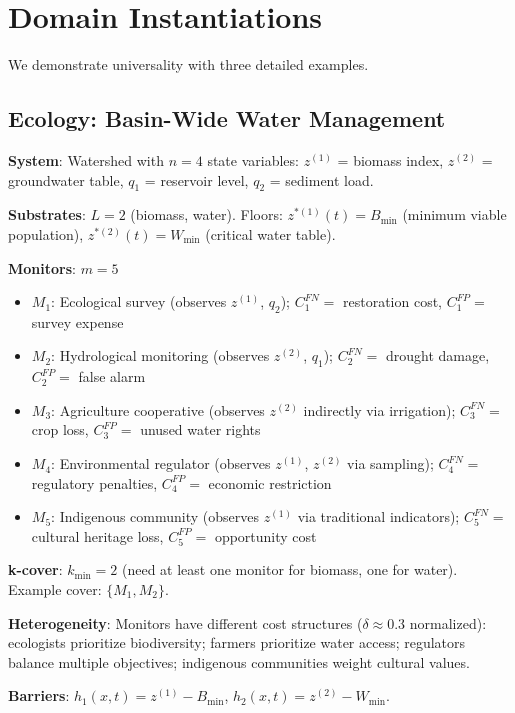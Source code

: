 \documentclass[11pt,a4paper]{article}
\begin{document}
\section{Domain Instantiations}

We demonstrate universality with three detailed examples.

\subsection{Ecology: Basin-Wide Water Management}

\textbf{System}: Watershed with $n=4$ state variables: $z^{(1)}$ = biomass index, $z^{(2)}$ = groundwater table, $q_1$ = reservoir level, $q_2$ = sediment load.

\textbf{Substrates}: $L=2$ (biomass, water). Floors: $z^{*(1)}(t) = B_{\min}$ (minimum viable population), $z^{*(2)}(t) = W_{\min}$ (critical water table).

\textbf{Monitors}: $m=5$
\begin{itemize}
\item $M_1$: Ecological survey (observes $z^{(1)}$, $q_2$); $C_1^{FN} = $ restoration cost, $C_1^{FP} = $ survey expense
\item $M_2$: Hydrological monitoring (observes $z^{(2)}$, $q_1$); $C_2^{FN} = $ drought damage, $C_2^{FP} = $ false alarm
\item $M_3$: Agriculture cooperative (observes $z^{(2)}$ indirectly via irrigation); $C_3^{FN} = $ crop loss, $C_3^{FP} = $ unused water rights
\item $M_4$: Environmental regulator (observes $z^{(1)}$, $z^{(2)}$ via sampling); $C_4^{FN} = $ regulatory penalties, $C_4^{FP} = $ economic restriction
\item $M_5$: Indigenous community (observes $z^{(1)}$ via traditional indicators); $C_5^{FN} = $ cultural heritage loss, $C_5^{FP} = $ opportunity cost
\end{itemize}

\textbf{k-cover}: $k_{\min} = 2$ (need at least one monitor for biomass, one for water). Example cover: $\{M_1, M_2\}$.

\textbf{Heterogeneity}: Monitors have different cost structures ($\delta \approx 0.3$ normalized): ecologists prioritize biodiversity; farmers prioritize water access; regulators balance multiple objectives; indigenous communities weight cultural values.

\textbf{Barriers}: $h_1(x,t) = z^{(1)} - B_{\min}$, $h_2(x,t) = z^{(2)} - W_{\min}$.
\end{document}
